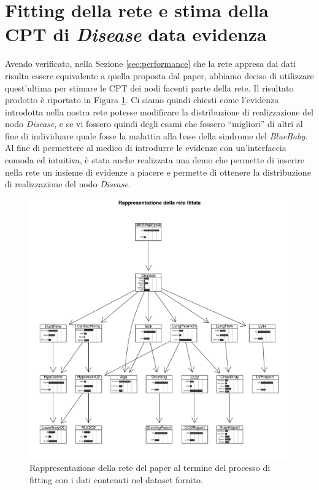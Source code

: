 \section{Fitting della rete e stima della CPT di \textit{Disease} data evidenza}
Avendo verificato, nella Sezione \ref{sec:performance} che la rete appresa dai dati risulta essere equivalente a quella proposta dal paper, abbiamo deciso di utilizzare quest'ultima per stimare le CPT dei nodi facenti parte della rete. Il risultato prodotto è riportato in Figura \ref{fig:paperfitted}. Ci siamo quindi chiesti come l'evidenza introdotta nella nostra rete potesse modificare la distribuzione di realizzazione del nodo \textit{Disease}, e se vi fossero quindi degli esami che fossero “migliori” di altri al fine di individuare quale fosse la malattia alla base della sindrome del \textit{BlueBaby}. Al fine di permettere al medico di introdurre le evidenze con un'interfaccia comoda ed intuitiva, è stata anche realizzata una demo che permette di inserire nella rete un insieme di evidenze a piacere e permette di ottenere la distribuzione di realizzazione del nodo \textit{Disease}.
\begin{figure}
	\centering
	\includegraphics[width=1\linewidth]{images/paper_fitted}
	\caption{Rappresentazione della rete del paper al termine del processo di fitting con i dati contenuti nel dataset fornito.}
	\label{fig:paperfitted}
\end{figure}
